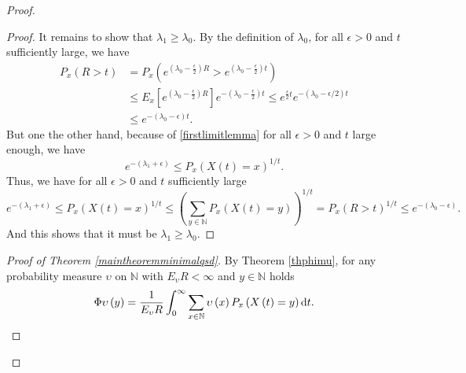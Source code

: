 \documentclass[12pt,a4paper]{scrartcl}
\numberwithin{equation}{section}
\newcommand{\N}{\mathbb{N}} %
\begin{document}
\begin{proof}
\begin{proof}
It remains to show that $\lambda_1 \geq \lambda_0.$
By the definition of $\lambda_0$, for all $\epsilon > 0$ and $t$ sufficiently large, we have
\begin{align*}
P_x\left(R > t\right) &= P_x\left(e^{\left(\lambda_0 - \frac{\epsilon}{2}\right)R } > e^{\left(\lambda_0 - \frac{\epsilon}{2}\right)t} \right) \\
&\leq E_x \left[ e^{\left(\lambda_0 - \frac{\epsilon}{2}\right)R } \right] e^{-\left(\lambda_0 - \frac{\epsilon}{2}\right)t} \leq e^{\frac{\epsilon}{2} t} e^{-\left(\lambda_0 - \epsilon/2\right)t} \\
&\leq e^{-\left(\lambda_0 - \epsilon\right)t}.
\end{align*}
But one the other hand, because of \eqref{firstlimitlemma} for all $\epsilon > 0$ and $t$ large enough, we have
$$e^{-\left(\lambda_1+\epsilon\right)} \leq P_x\left(X\left(t\right)=x\right)^{1/t}.$$ 
Thus, we have for all $\epsilon >0$ and $t$ sufficiently large
$$e^{-\left(\lambda_1+\epsilon\right)} \leq P_x\left(X\left(t\right)=x\right)^{1/t} \leq \left(\sum_{y \in \N}P_x\left(X\left(t\right)=y \right) \right)^{1/t} = P_x\left(R > t \right)^{1/t} \leq e^{-\left(\lambda_0 - \epsilon\right)}.$$
And this shows that it must be $\lambda_1 \geq \lambda_0.$

\end{proof}

\begin{proof}[Proof of Theorem \ref{maintheoremminimalqsd}]
By Theorem \ref{thphimu}, for any probability measure $\upsilon$ on $\N$ with $E_{\upsilon} R < \infty$ and $y\in \N$ holds
$$ \Phi\upsilon\left(y\right) = \frac{1}{E_{\upsilon} R} \int_0^{\infty} \sum_{x \in \N} \upsilon\left(x\right) P_x\left(X\left(t\right) = y\right) \textnormal{d}t. $$


\end{proof}
\end{proof}
\end{document}
